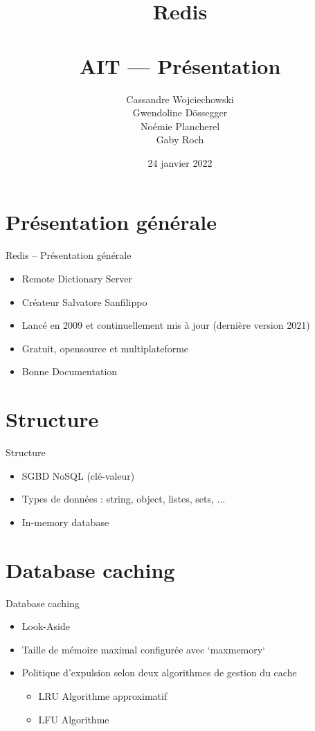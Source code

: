\documentclass[aspectratio=169]{beamer}
\title{Redis\\~\\AIT --- Présentation}
\author{Cassandre Wojciechowski \\ Gwendoline Dössegger \\ Noémie Plancherel \\ Gaby Roch}
\date{24 janvier 2022}
\begin{document}
\begin{frame}
  \titlepage
\end{frame}
\begin{frame}
  \tableofcontents
\end{frame}

\section{Présentation générale}
\begin{frame}{Redis -- Présentation générale}
 \begin{itemize}
  \item Remote Dictionary Server
  \item Créateur Salvatore Sanfilippo
  \item Lancé en 2009 et continuellement mis à jour (dernière version 2021)
  \item Gratuit, opensource et multiplateforme
  \item Bonne Documentation
 \end{itemize}
\end{frame}

\section{Structure}
\begin{frame}{Structure}
\begin{itemize}
  \item SGBD NoSQL (clé-valeur)
  \item Types de données : string, object, listes, sets, ...
  \item In-memory database
\end{itemize}
\end{frame}

\section{Database caching}
\begin{frame}{Database caching}
\begin{itemize}
  \item Look-Aside 
  \item Taille de mémoire maximal configurée avec `maxmemory`
  \item Politique d'expulsion selon deux algorithmes de gestion du cache
  \begin{itemize}
    \item LRU Algorithme approximatif
    \item LFU Algorithme
 \end{itemize}
\end{itemize}
\end{frame}
\end{document}

